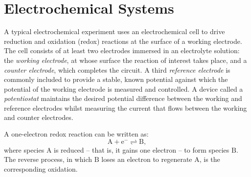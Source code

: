 
\chapter{Electrochemical Systems}

A typical electrochemical experiment uses an electrochemical cell to drive
reduction and oxidation (redox) reactions at the surface of a working
electrode. The cell consists of at least two electrodes immersed in an
electrolyte solution: the \emph{working electrode}, at whose surface the
reaction of interest takes place, and a \emph{counter electrode}, which
completes the circuit. A third \emph{reference electrode} is commonly
included to provide a stable, known potential against which the potential
of the working electrode is measured and controlled. A device called a
\emph{potentiostat} maintains the desired potential difference between the
working and reference electrodes whilst measuring the current that flows
between the working and counter electrodes.

A one-electron redox reaction can be written as:
\begin{equation}\label{eq:redox}
  \mathrm{A} + \mathrm{e}^{-} \rightleftharpoons \mathrm{B},
\end{equation}
where species $\mathrm{A}$ is reduced -- that is, it gains one electron --
to form species $\mathrm{B}$. The reverse process, in which $\mathrm{B}$
loses an electron to regenerate $\mathrm{A}$, is the corresponding
oxidation.


